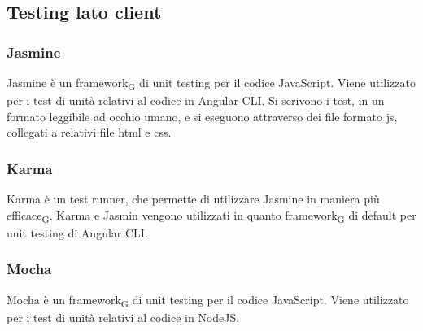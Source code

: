 \subsection{Testing lato client}

\subsubsection{Jasmine}
Jasmine è un framework\textsubscript{G} di unit testing per il codice JavaScript.
Viene utilizzato per i test di unità relativi al codice in Angular CLI.
Si scrivono i test, in un formato leggibile ad occhio umano, e si eseguono attraverso dei file formato js, collegati a relativi file html e css.

\subsubsection{Karma}
Karma è un test runner, che permette di utilizzare Jasmine in maniera più efficace\textsubscript{G}.
Karma e Jasmin vengono utilizzati in quanto framework\textsubscript{G} di default per unit testing di Angular CLI.

\subsubsection{Mocha}
Mocha è un framework\textsubscript{G} di unit testing per il codice JavaScript.
Viene utilizzato per i test di unità relativi al codice in NodeJS.